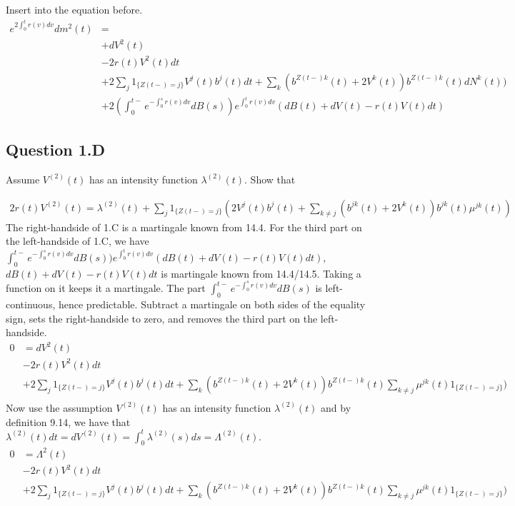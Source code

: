 \documentclass[10pt]{article}
\begin{document}
Insert into the equation before.
\begin{equation}
\begin{split}
e^{2\int_0^t r(v)dv}dm^2(t) & = \\
& + dV^2(t) \\
& - 2 r(t) V^2(t)dt \\
& + 2 \sum_j 1_{\{Z(t-)=j\}} V^j(t)b^{j}(t)dt + \sum_{k} (b^{Z(t-)k}(t) + 2V^k(t))b^{Z(t-)k}(t)dN^k(t)) \\
& + 2(\int_0^{t-} {e^{-\int_0^s {r(v) dv}}dB(s)}) e^{\int_0^t r(v)dv} (dB(t) + dV(t) - r(t)V(t)dt)
\end{split}
\end{equation}

\newpage

\subsection{Question 1.D}
Assume $V^{(2)}(t)$ has an intensity function $\lambda^{(2)}(t)$. Show that

\begin{equation}
\begin{split}
 2r(t)V^{(2)}(t) = \lambda^{(2)}(t) + \sum_j 1_{\{Z(t-) = j\}}(2V^j(t)b^j(t) + \sum_{k \neq j}(b^{jk}(t) + 2V^k(t))b^{jk}(t)\mu^{jk}(t))
\end{split}
\end{equation}
The right-handside of 1.C is a martingale known from 14.4. For the third part on the left-handside of 1.C, we have $\int_0^{t-} {e^{-\int_0^s {r(v) dv}}dB(s)}) e^{\int_0^t r(v)dv} (dB(t) + dV(t) - r(t)V(t)dt)$, $dB(t) + dV(t) - r(t)V(t)dt$ is martingale known from 14.4/14.5. Taking a function on it keeps it a martingale. The part $\int_0^{t-} {e^{-\int_0^s {r(v) dv}}dB(s)} $ is left-continuous, hence predictable.  Subtract a martingale on both sides of the equality sign, sets the right-handside to zero, and removes the third part on the left-handside.
\begin{equation}
\begin{split}
0 & = dV^2(t) \\
& - 2 r(t) V^2(t)dt \\
& + 2 \sum_j 1_{\{Z(t-)=j\}} V^j(t)b^{j}(t)dt + \sum_{k} (b^{Z(t-)k}(t) + 2V^k(t))b^{Z(t-)k}(t)\sum_{k\neq j} \mu^{jk}(t)1_{\{Z(t-)=j\}}) \\
\end{split}
\end{equation}
Now use the assumption $V^{(2)}(t)$ has an intensity function $\lambda^{(2)}(t)$ and by definition 9.14, we have that $\lambda^{(2)}(t)dt = dV^{(2)}(t) = \int_0^t \lambda^{(2)}(s)ds = \Lambda^{(2)}(t)$.
\begin{equation}
\begin{split}
0 & = \Lambda^2(t) \\
& - 2 r(t) V^2(t)dt \\
& + 2 \sum_j 1_{\{Z(t-)=j\}} V^j(t)b^{j}(t)dt + \sum_{k} (b^{Z(t-)k}(t) + 2V^k(t))b^{Z(t-)k}(t)\sum_{k\neq j} \mu^{jk}(t)1_{\{Z(t-)=j\}}) \\
\end{split}
\end{equation}
\end{document}
